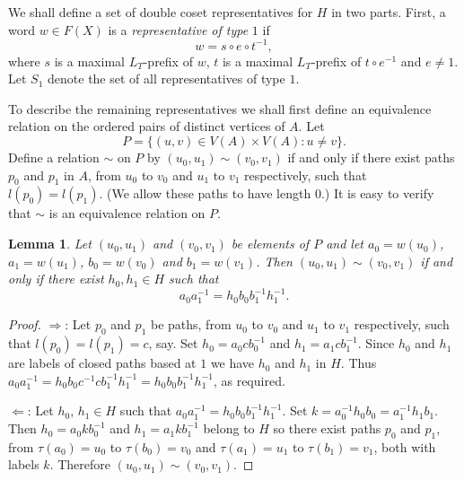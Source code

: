 \documentclass[a4paper,12pt]{article}
\renewcommand{\t}{\tau }
\newtheorem{lemma}[theorem]{Lemma}
\numberwithin{equation}{section}
\numberwithin{figure}{section}
\begin{document}
We shall define a set of double coset representatives for $H$ in two parts. 
First, a word $w\in F(X)$ is a {\em representative of type} $1$ if 
\[w=s\circ e \circ t^{-1},\]
where $s$ is a maximal $L_T$-prefix of $w$, $t$ is a maximal $L_T$-prefix of 
$t\circ e^{-1}$ and $e\neq 1$. Let $S_1$ denote the set of all representatives of 
type $1$. 

To describe the remaining representatives we shall first define an equivalence
relation on the ordered pairs of distinct vertices of $A$. Let
\[P=\{(u,v)\in V(A)\times V(A): u\neq v\}.\]
Define a relation $\sim$ on $P$ by $(u_0,u_1)\sim (v_0,v_1)$ if and only if 
there exist paths $p_0$ and $p_1$ in $A$, from $u_0$ to $v_0$ and $u_1$ to $v_1$ 
respectively, such that $l(p_0)=l(p_1)$. (We allow these paths to have length $0$.)
It is easy to verify that $\sim$ is an equivalence relation on $P$. 

\begin{lemma}\label{lem:equiv_verts}
Let $(u_0,u_1)$ and $(v_0,v_1)$ be elements of $P$ and let 
$a_0=w(u_0)$, $a_1=w(u_1)$, $b_0=w(v_0)$ and $b_1=w(v_1)$. Then 
$(u_0,u_1)\sim (v_0,v_1)$ if and only if there exist $h_0,h_1\in H$ such that
\[a_0a_1^{-1}=h_0b_0b_1^{-1}h_1^{-1}.\]
\end{lemma}  
\begin{proof}
$\Rightarrow$: Let $p_0$ and $p_1$ be paths, from $u_0$ to $v_0$ and $u_1$ to $v_1$ 
respectively, such that $l(p_0)=l(p_1)=c$, say. Set $h_0=a_0cb_0^{-1}$ and 
$h_1=a_1cb_1^{-1}$. Since $h_0$ and $h_1$ are labels of closed paths based at $1$ we
have $h_0$ and $h_1$ in $H$. Thus 
$a_0a_1^{-1}=h_0b_0c^{-1}cb_1^{-1}h_1^{-1}=h_0b_0b_1^{-1}h_1^{-1}$, as required.

$\Leftarrow$: Let $h_0$, $h_1 \in H$ such that $a_0a_1^{-1}=h_0b_0b_1^{-1}h_1^{-1}$. 
Set $k=a_0^{-1}h_0b_0=a_1^{-1}h_1b_1$. Then $h_0=a_0kb_0^{-1}$ and $h_1=a_1kb_1^{-1}$
belong to $H$ so there exist paths $p_0$ and $p_1$, 
from $\t(a_0)=u_0$ to $\t(b_0)=v_0$ and 
$\t(a_1)=u_1$ to $\t(b_1)=v_1$, both with labels $k$. 
Therefore $(u_0,u_1)\sim (v_0,v_1)$. 
\end{proof}  
\end{document}
